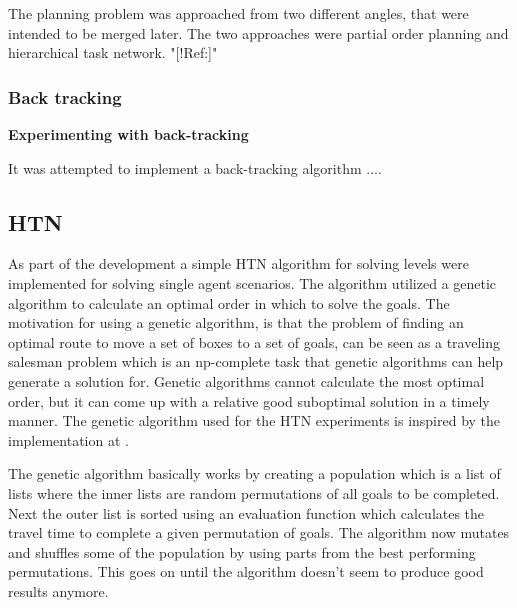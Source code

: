 \documentclass[Main]{subfiles}
\begin{document}
The planning problem was approached from two different angles, that were intended to be merged later. The two approaches were partial order planning and hierarchical task network. "[!Ref:]" 


\subsubsection{Back tracking}

\textbf{Experimenting with back-tracking}

It was attempted to implement a back-tracking algorithm ....






\subsection{HTN}
As part of the development a simple HTN algorithm for solving levels were implemented for solving single agent scenarios.
The algorithm utilized a genetic algorithm to calculate an optimal order in which to solve the goals.
The motivation for using a genetic algorithm, is that the problem of finding an optimal route to move a set of boxes to a set of goals, can be seen as a traveling salesman problem which is an np-complete task that genetic algorithms can help generate a solution for.
Genetic algorithms cannot calculate the most optimal order, but it can come up with a relative good suboptimal solution in a timely manner. The genetic algorithm used for the HTN experiments is inspired by the implementation at \cite{genetic}.

The genetic algorithm basically works by creating a population which is a list of lists where the inner lists are random permutations of all goals to be completed.
Next the outer list is sorted using an evaluation function which calculates the travel time to complete a given permutation of goals.
The algorithm now mutates and shuffles some of the population by using parts from the best performing permutations.
This goes on until the algorithm doesn't seem to produce good results anymore.
\end{document}

